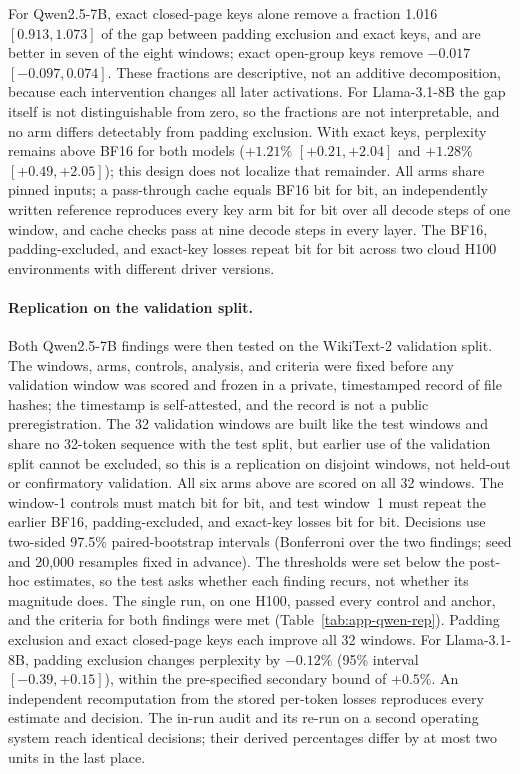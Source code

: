 \documentclass{article}
\begin{document}
For Qwen2.5-7B, exact closed-page keys alone remove a fraction 1.016 $[0.913, 1.073]$ of the gap between
padding exclusion and exact keys, and are better in seven of the eight windows; exact open-group keys
remove $-0.017$ $[-0.097, 0.074]$. These fractions are descriptive, not an additive decomposition, because
each intervention changes all later activations. For Llama-3.1-8B the gap itself is not distinguishable
from zero, so the fractions are not interpretable, and no arm differs detectably from padding exclusion.
With exact keys, perplexity remains above BF16 for both models ($+1.21\%$ $[+0.21, +2.04]$ and $+1.28\%$
$[+0.49, +2.05]$); this design does not localize that remainder. All arms share pinned inputs; a
pass-through cache equals BF16 bit for bit, an independently written reference reproduces every key
arm bit for bit over all decode steps of one window, and cache checks pass at nine decode steps in every
layer. The BF16, padding-excluded, and exact-key losses repeat bit for bit across two cloud H100
environments with different driver versions.

\paragraph{Replication on the validation split.}
Both Qwen2.5-7B findings were then tested on the WikiText-2 validation split. The windows, arms,
controls, analysis, and criteria were fixed before any validation window was scored and frozen in a
private, timestamped record of file hashes; the timestamp is self-attested, and the record is not a
public preregistration. The 32 validation windows are built like the test windows and share no 32-token
sequence with the test split, but earlier use of the validation split cannot be excluded, so this is a
replication on disjoint windows, not held-out or confirmatory validation. All six arms above are scored
on all 32 windows. The window-1 controls must match bit for bit, and test window~1 must repeat the
earlier BF16, padding-excluded, and exact-key losses bit for bit. Decisions use two-sided 97.5\%
paired-bootstrap intervals (Bonferroni over the two findings; seed and 20,000 resamples fixed in
advance). The thresholds were set below the post-hoc estimates, so the test asks whether each finding
recurs, not whether its magnitude does. The single run, on one H100, passed every control and anchor,
and the criteria for both findings were met (Table~\ref{tab:app-qwen-rep}). Padding exclusion and exact
closed-page keys each improve all 32 windows. For Llama-3.1-8B, padding exclusion changes perplexity by
$-0.12\%$ (95\% interval $[-0.39, +0.15]$), within the pre-specified secondary bound of $+0.5\%$.
An independent recomputation from the stored per-token losses reproduces every estimate and decision.
The in-run audit and its re-run on a second operating system reach identical decisions; their
derived percentages differ by at most two units in the last place.
\end{document}
